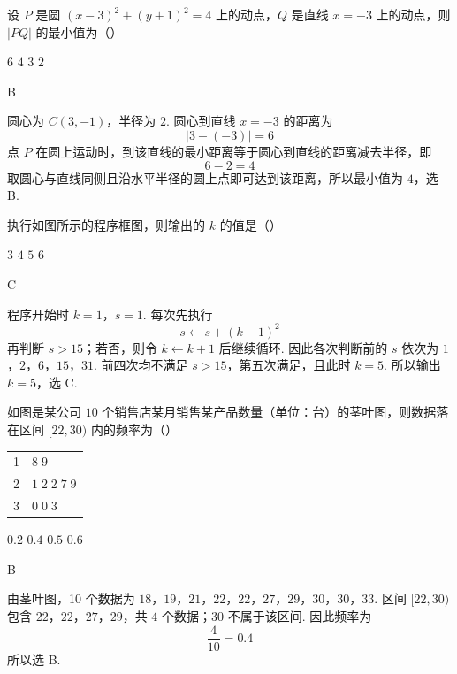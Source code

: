\begin{problem}
设 \(P\) 是圆 \((x - 3)^2 + (y + 1)^2 = 4\) 上的动点，\(Q\) 是直线 \(x = -3\) 上的动点，则 \(|PQ|\) 的最小值为（\quad）

\choices
    {\(6\)}
    {\(4\)}
    {\(3\)}
    {\(2\)}
\begin{answer}
B
\end{answer}
\begin{solution}
圆心为 \(C(3,-1)\)，半径为 \(2\). 圆心到直线 \(x=-3\) 的距离为
\[
|3-(-3)|=6
\]
点 \(P\) 在圆上运动时，到该直线的最小距离等于圆心到直线的距离减去半径，即
\[
6-2=4
\]
取圆心与直线同侧且沿水平半径的圆上点即可达到该距离，所以最小值为 \(4\)，选 B.
\end{solution}
\end{problem}

\begin{problem}
执行如图所示的程序框图，则输出的 \(k\) 的值是（\quad）


\choices
    {\(3\)}
    {\(4\)}
    {\(5\)}
    {\(6\)}
\begin{answer}
C
\end{answer}
\begin{solution}
程序开始时 \(k=1\)，\(s=1\). 每次先执行
\[
s\leftarrow s+(k-1)^2
\]
再判断 \(s>15\)；若否，则令 \(k\leftarrow k+1\) 后继续循环. 因此各次判断前的 \(s\) 依次为
\(1\)，\(2\)，\(6\)，\(15\)，\(31\).
前四次均不满足 \(s>15\)，第五次满足，且此时 \(k=5\). 所以输出 \(k=5\)，选 C.
\end{solution}
\end{problem}

\begin{problem}
如图是某公司 \(10\text{ 个}\)销售店某月销售某产品数量（单位：台）的茎叶图，则数据落在区间 \([22,30)\) 内的频率为（\quad）

\begin{center}
\begin{tabular}{c|l}
1 & \(8\;9\) \\
2 & \(1\;2\;2\;7\;9\) \\
3 & \(0\;0\;3\)
\end{tabular}
\end{center}

\choices
    {\(0.2\)}
    {\(0.4\)}
    {\(0.5\)}
    {\(0.6\)}
\begin{answer}
B
\end{answer}
\begin{solution}
由茎叶图，10 个数据为
\(18\)，\(19\)，\(21\)，\(22\)，\(22\)，\(27\)，\(29\)，\(30\)，\(30\)，\(33\).
区间 \([22,30)\) 包含 \(22\)，\(22\)，\(27\)，\(29\)，共 \(4\) 个数据；\(30\) 不属于该区间. 因此频率为
\[
\frac{4}{10}=0.4
\]
所以选 B.
\end{solution}
\end{problem}

